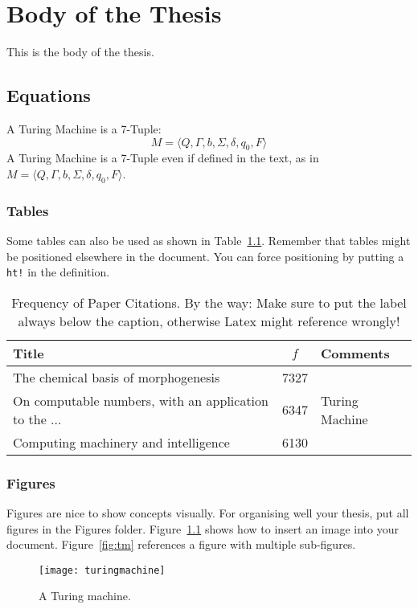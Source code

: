 \chapter{Body of the Thesis}

This is the body of the thesis.

\section{Equations}
A Turing Machine is a 7-Tuple:
\begin{equation}
    M = \langle Q, \Gamma, b, \Sigma, \delta, q_0, F \rangle
\end{equation}
A Turing Machine is a 7-Tuple even if defined in the text, as in $M = \langle Q, \Gamma, b, \Sigma, \delta, q_0, F \rangle$.

\subsection{Tables}
Some tables can also be used as shown in Table~\ref{tab:table}. Remember that tables might be positioned elsewhere in the document. You can force positioning by putting a \texttt{ht!} in the definition.

\begin{table}[ht!]
\centering
\begin{tabular}{|l|c|l|} \hline
Title&$f$&Comments\\ \hline
The chemical basis of morphogenesis & 7327 & \\ \hline
On computable numbers, with an application to the ... & 6347 & Turing Machine\\ \hline
Computing machinery and intelligence & 6130 & \\ \hline
\end{tabular}
\caption{Frequency of Paper Citations. By the way: Make sure to put the label always below the caption, otherwise Latex might reference wrongly!}
\label{tab:table}
\end{table}


\subsection{Figures}
Figures are nice to show concepts visually. For organising well your thesis, put all figures in the Figures folder. Figure~\ref{fig:machine} shows how to insert an image into your document. Figure~\ref{fig:tm} references a figure with multiple sub-figures.

\begin{figure}
\centering
\texttt{[image: turingmachine]}
\caption{A Turing machine.}
\label{fig:machine}
\end{figure}


